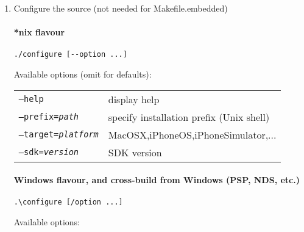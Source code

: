 \begin{enumerate}
\item Configure the source (not needed for Makefile.embedded)

\paragraph{*nix flavour}
\begin{lstlisting}
./configure [--option ...]
\end{lstlisting}

Available options (omit for defaults):

\begin{tabular}{ll}	
{\tt --help}                  & display help                             \\
{\tt --prefix={\it path}}     & specify installation prefix (Unix shell) \\
{\tt --target={\it platform}} & MacOSX,iPhoneOS,iPhoneSimulator,...      \\
{\tt --sdk={\it version}}     & SDK version                              \\
\end{tabular}

\paragraph{Windows flavour, and cross-build from Windows (PSP, NDS, etc.)}

\begin{lstlisting}
.\configure [/option ...]
\end{lstlisting}

Available options:


\end{enumerate}
